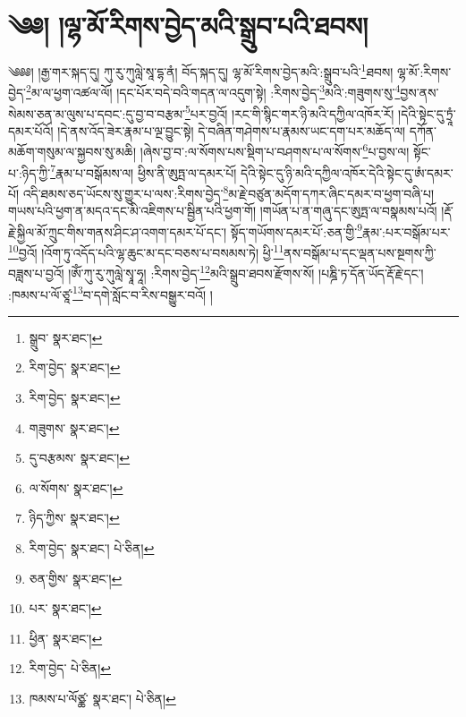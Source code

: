 \setcounter{footnote}{0} 
\chapter{༄༅། །ལྷ་མོ་རིགས་བྱེད་མའི་སྒྲུབ་པའི་ཐབས།}༄༅༅། །རྒྱ་གར་སྐད་དུ། ཀུ་རུ་ཀུལླེ་སཱ་དྷ་ནཾ། བོད་སྐད་དུ། ལྷ་མོ་རིགས་བྱེད་མའི་:སྒྲུབ་པའི་\footnote{སྒྲུབ་  སྣར་ཐང་། }ཐབས། ལྷ་མོ་:རིགས་བྱེད་\footnote{རིག་བྱེད་  སྣར་ཐང་། }མ་ལ་ཕྱག་འཚལ་ལོ། །དང་པོར་བདེ་བའི་གདན་ལ་འདུག་སྟེ། :རིགས་བྱེད་\footnote{རིག་བྱེད་  སྣར་ཐང་། }མའི་:གཟུགས་སུ་\footnote{གཟུགས་  སྣར་ཐང་། }བྱས་ནས་སེམས་ཅན་མ་ལུས་པ་དབང་:དུ་བྱ་བ་བརྩམ་\footnote{དུ་བརྩམས་  སྣར་ཐང་། }པར་བྱའོ། །རང་གི་སྙིང་གར་ཉི་མའི་དཀྱིལ་འཁོར་རོ། །དེའི་སྟེང་དུ་ཏྲཱཾ་དམར་པོའོ། །དེ་ནས་འོད་ཟེར་རྣམ་པ་ལྔ་བྱུང་སྟེ། དེ་བཞིན་གཤེགས་པ་རྣམས་ཡང་དག་པར་མཆོད་ལ། དཀོན་མཆོག་གསུམ་ལ་སྐྱབས་སུ་མཆི། །ཞེས་བྱ་བ་:ལ་སོགས་པས་སྡིག་པ་བཤགས་པ་ལ་སོགས་\footnote{ལ་སོགས་  སྣར་ཐང་། }པ་བྱས་ལ། སྟོང་པ་:ཉིད་ཀྱི་\footnote{ཉིད་ཀྱིས་  སྣར་ཐང་། }རྣམ་པ་བསྒོམས་ལ། ཕྱིས་ནི་ཨུཏྤ་ལ་དམར་པོ། དེའི་སྟེང་དུ་ཉི་མའི་དཀྱིལ་འཁོར་དེའི་སྟེང་དུ་ཨཾ་དམར་པོ། འདི་ཐམས་ཅད་ཡོངས་སུ་གྱུར་པ་ལས་:རིགས་བྱེད་\footnote{རིག་བྱེད་  སྣར་ཐང་།  པེ་ཅིན། }མ་རྗེ་བཙུན་མདོག་དཀར་ཞིང་དམར་བ་ཕྱག་བཞི་པ། གཡས་པའི་ཕྱག་ན་མདའ་དང་མི་འཇིགས་པ་སྦྱིན་པའི་ཕྱག་གོ། །གཡོན་པ་ན་གཞུ་དང་ཨུཏྤ་ལ་བསྣམས་པའོ། །རྡོ་རྗེ་སྐྱིལ་མོ་ཀྲུང་གིས་གནས་ཤིང་ཤ་འགག་དམར་པོ་དང་། སྟོད་གཡོགས་དམར་པོ་:ཅན་གྱི་\footnote{ཅན་གྱིས་  སྣར་ཐང་། }རྣམ་:པར་བསྒོམ་པར་\footnote{པར་  སྣར་ཐང་། }བྱའོ། །འོག་ཏུ་འདོད་པའི་ལྷ་ཆུང་མ་དང་བཅས་པ་བསམས་ཏེ། ཕྱི་\footnote{ཕྱིན་  སྣར་ཐང་། }ནས་བསྒོམ་པ་དང་ལྡན་པས་སྔགས་ཀྱི་བཟླས་པ་བྱའོ། །ཨོཾ་ཀུ་རུ་ཀུལླེ་སྭཱ་ཧཱ། :རིགས་བྱེད་\footnote{རིག་བྱེད་  པེ་ཅིན། }མའི་སྒྲུབ་ཐབས་རྫོགས་སོ། །པཎྜི་ཏ་དོན་ཡོད་རྡོ་རྗེ་དང་། :ཁམས་པ་ལོ་ཙཱ་\footnote{ཁམས་པ་ལོཙྪ་  སྣར་ཐང་།  པེ་ཅིན། }བ་དགེ་སློང་བ་རིས་བསྒྱུར་བའོ། ། 